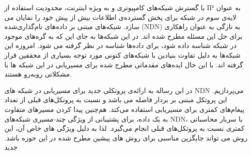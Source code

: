 

\pagestyle{empty}

\begin{center}
\end{center}

با گسترش شبکه‌های کامپیوتری و به ویژه اینترنت، محدودیت استفاده از IP به عنوان لایه‌ی سوم در شبکه برای پخش گسترده‌ی اطلاعات بیش از پیش خود را نمایان می سازد. شبکه‌های مبتنی بر داده‌های نام‌گذاری‌شده (NDN) به تازگی به عنوان راهکاری برای حل این مسئله مطرح شده اند. در این شبکه‌ها به جای این که به گره‌های موجود در شبکه شناسه داده شود، برای داده‌ها شناسه در نظر گرفته می شود. امروزه این شبکه‌ها به دلیل تفاوت بنیادین با شبکه‌های کنونی مورد توجه بسیاری از محققین قرار گرفته اند. با این حال ایده‌های مقدماتی مطرح شده برای مسیریابی در این شبکه ها با مشکلاتی روبه‌رو هستند. 

در این رساله به ارائه‌ی پروتکلی جدید برای مسیریابی در شبکه های ‌NDN می‌پردازیم. این پروتکل مبتنی بر بردار فاصله می باشد و نسبت به پروتکل‌های قبلی از تعداد پیغام‌های کمتری برای مسیریابی استفاده می‌کند. هم‌چنین پیدا کردن مسیرهای متفاوت به یک داده، برای پشتیبانی از ویژگی چند-مسیری شبکه‌های NDN، با سربار محاسباتی کمتری نسبت به پروتکل‌های قبلی انجام می‌گیرد. لذا به دلیل ویژگی های خاص آن، این روش می تواند جایگزین مناسبی برای روش های پیشین مطرح شده در این حوزه باشد.
‌جدید
